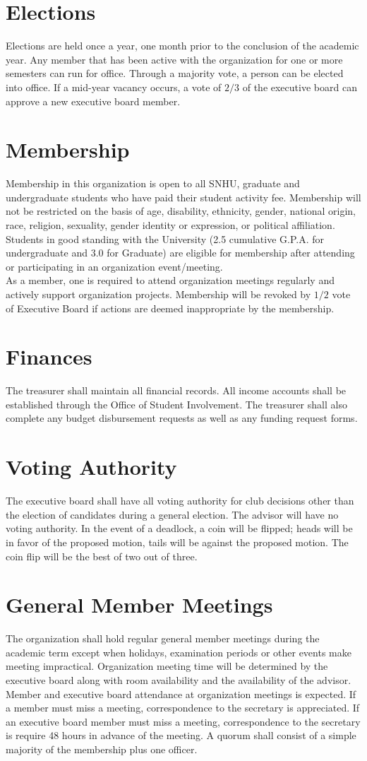 \documentclass{article}
\newcommand{\article}[1]{\section{#1} \label{#1}}
\begin{document}
\article{Elections}
Elections are held once a year, one month prior to the conclusion of the academic year. 
Any member that has been active with the organization for one or more semesters can run for office. 
Through a majority vote, a person can be elected into office. 
If a mid-year vacancy occurs, a vote of $2/3$ of the executive board can approve a new executive board member.

\article{Membership}
Membership in this organization is open to all SNHU, graduate and undergraduate students who have paid their student activity fee. 
Membership will not be restricted on the basis of age, disability, ethnicity, gender, national origin, race, religion, sexuality, gender identity or expression, or political affiliation. 
Students in good standing with the University (2.5 cumulative  G.P.A. for undergraduate and 3.0 for Graduate) are eligible for membership after attending or participating in an organization event/meeting.\\

As a member, one is required to attend organization meetings regularly and actively support organization projects. 
Membership will be revoked by $1/2$ vote of Executive Board if actions are deemed inappropriate by the membership.

\article{Finances}
The treasurer shall maintain all financial records. 
All income accounts shall be established through the Office of Student Involvement. 
The treasurer shall also complete any budget disbursement requests as well as any funding request forms.

\article{Voting Authority}
The executive board shall have all voting authority for club decisions other than the election of candidates during a general election. 
The advisor will have no voting authority. 
In the event of a deadlock, a coin will be flipped; heads will be in favor of the proposed motion, tails will be against the proposed motion. 
The coin flip will be the best of two out of three.

\article{General Member Meetings}
The organization shall hold regular general member meetings during the academic term except when holidays, examination periods or other events make meeting impractical. 
Organization meeting time will be determined by the executive board along with room availability and the availability of the advisor. 
Member and executive board attendance at organization meetings is expected. 
If a member must miss a meeting, correspondence to the secretary is appreciated. 
If an executive board member must miss a meeting, correspondence to the secretary is require 48 hours in advance of the meeting. 
A quorum shall consist of a simple majority of the membership plus one officer.
 
\end{document}

